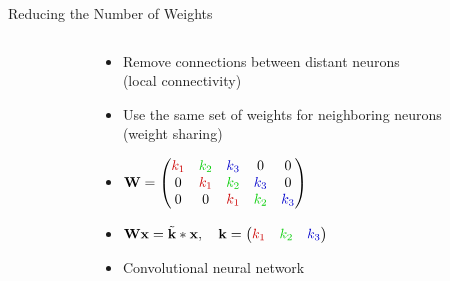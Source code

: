 \documentclass{beamer}
\begin{document}
\begin{frame}{Reducing the Number of Weights}
\begin{columns}[onlytextwidth]
\begin{column}{0.45\textwidth}
\end{column}
\begin{column}{0.55\textwidth}
\begin{itemize}
\item<2-> Remove connections between distant neurons\\ (\alert{local
connectivity})
\item<3-> Use the same set of weights for neighboring neurons\\ (\alert{weight
sharing})
\item<3-> $\vect{W}=
\begin{pmatrix}
\textcolor{red!80!black}{k_1} & \textcolor{green!80!black}{k_2} &
\textcolor{blue!80!black}{k_3} & 0 & 0
\\
0 & \textcolor{red!80!black}{k_1} & \textcolor{green!80!black}{k_2} &
\textcolor{blue!80!black}{k_3} & 0 \\
0 & 0 & \textcolor{red!80!black}{k_1} & \textcolor{green!80!black}{k_2} &
\textcolor{blue!80!black}{k_3} \\
\end{pmatrix}$
\item<4-> $\vect{W}\vect{x} = \tilde{\vect{k}} * \vect{x}, \quad\vect{k} =
\begin{pmatrix} \textcolor{red!80!black}{k_1} & \textcolor{green!80!black}{k_2} &
\textcolor{blue!80!black}{k_3} \\
\end{pmatrix}$
\item<4->[$\Rightarrow$] \alert{Convolutional neural network}
\end{itemize}
\end{column}
\end{columns}
\end{frame}
\end{document}
